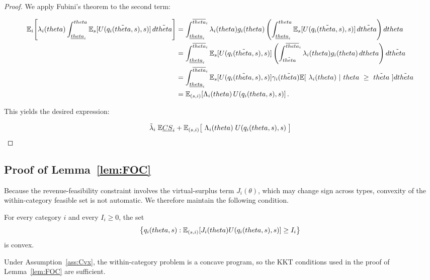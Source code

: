 \documentclass[master.tex]{subfiles}
\begin{document}
\begin{proof}
We apply Fubini's theorem to the second term:

\begin{align*}
\mathbb{E}_i\!\left[\lambda_i(theta)\int_{\underline{theta}_i}^{theta}
\mathbb{E}_s[U(q_i(\tilde{theta},s),s)]\,d\tilde{theta}\right]
&= \int_{\underline{theta}_i}^{\overline{theta}_i} \lambda_i(theta) g_i(theta) 
   \left(\int_{\underline{theta}_i}^{theta} \mathbb{E}_s[U(q_i(\tilde{theta},s),s)]\,d\tilde{theta}\right) dtheta \\
&= \int_{\underline{theta}_i}^{\overline{theta}_i} \mathbb{E}_s[U(q_i(\tilde{theta},s),s)] 
   \left(\int_{\tilde{theta}}^{\overline{theta}_i} \lambda_i(theta) g_i(theta)\,dtheta\right) d\tilde{theta} \\
&= \int_{\underline{theta}_i}^{\overline{theta}_i} \mathbb{E}_s[U(q_i(\tilde{theta},s),s)] 
    \gamma_i(\tilde {theta}) \mathbb{E}[ \ \lambda_i( theta) \ | \ theta \ \ge \ \tilde {theta} \ ] d\tilde{theta} \\
&= \mathbb{E}_{(s,i)}\!\left[\Lambda_i(theta)\, U(q_i(theta,s),s)\right].
\end{align*}

This yields the desired expression:

\[ \tilde{\lambda}_i \;\mathbb{E}\underline{CS}_i 
      + \mathbb{E}_{(s,i)} \big[\; \Lambda_i(theta)\;  U(q_i(theta,s),s)\; \big] \]

\end{proof}


\subsection{Proof of Lemma~\ref{lem:FOC}}

Because the revenue-feasibility constraint involves the virtual-surplus term $J_i(\theta)$, which may change sign across types, convexity of the within-category feasible set is not automatic. We therefore maintain the following condition.

\begin{assumption}\label{ass:Cvx}
For every category $i$ and every $I_i \ge 0$, the set
\[
\left\{
q_i(theta,s):
\mathbb{E}_{(s,i)}\!\left[J_i(theta)U(q_i(theta,s),s)\right] \ge I_i
\right\}
\]
is convex.
\end{assumption}

Under Assumption~\ref{ass:Cvx}, the within-category problem is a concave program, so the KKT conditions used in the proof of Lemma~\ref{lem:FOC} are sufficient.
\end{document}
